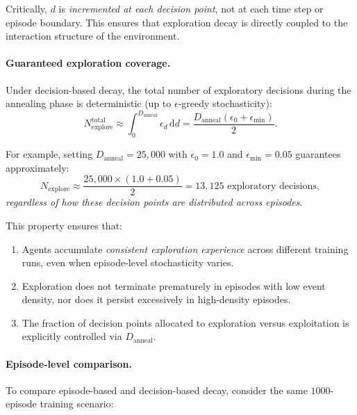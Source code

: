 Critically, $d$ is \emph{incremented at each decision point}, not at each time
step or episode boundary. This ensures that exploration decay is directly coupled
to the interaction structure of the environment.

\paragraph{Guaranteed exploration coverage.}
Under decision-based decay, the total number of exploratory decisions during the
annealing phase is deterministic (up to $\epsilon$-greedy stochasticity):
\begin{equation}
N_{\mathrm{explore}}^{\mathrm{total}}
\approx
\int_0^{D_{\mathrm{anneal}}} \epsilon_d \, \mathrm{d}d
=
\frac{D_{\mathrm{anneal}}(\epsilon_0 + \epsilon_{\min})}{2}.
\label{eq:guaranteed_explore}
\end{equation}

For example, setting $D_{\mathrm{anneal}}=25{,}000$ with $\epsilon_0=1.0$ and
$\epsilon_{\min}=0.05$ guarantees approximately:
\begin{equation}
N_{\mathrm{explore}}
\approx
\frac{25{,}000 \times (1.0 + 0.05)}{2}
=
13{,}125
\text{ exploratory decisions},
\label{eq:guaranteed_explore_example}
\end{equation}
\emph{regardless of how these decision points are distributed across episodes}.

This property ensures that:
\begin{enumerate}
\item Agents accumulate \emph{consistent exploration experience} across different
training runs, even when episode-level stochasticity varies.

\item Exploration does not terminate prematurely in episodes with low event
density, nor does it persist excessively in high-density episodes.

\item The fraction of decision points allocated to exploration versus exploitation
is explicitly controlled via $D_{\mathrm{anneal}}$.
\end{enumerate}

\paragraph{Episode-level comparison.}
To compare episode-based and decision-based decay, consider the same $1000$-episode
training scenario:


